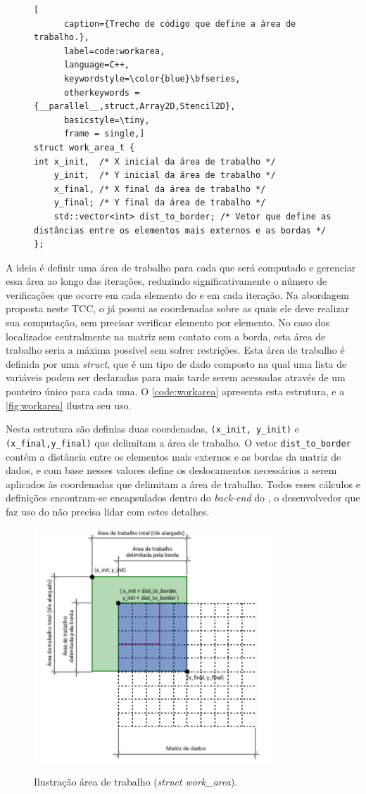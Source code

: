 \begin{figure}[b]
  \begin{lstlisting}[
      caption={Trecho de código que define a área de trabalho.}, 
      label=code:workarea,
      language=C++,
      keywordstyle=\color{blue}\bfseries,
      otherkeywords = {__parallel__,struct,Array2D,Stencil2D}, 
      basicstyle=\tiny, 
      frame = single,]
struct work_area_t {
int x_init,  /* X inicial da área de trabalho */
    y_init,  /* Y inicial da área de trabalho */
    x_final, /* X final da área de trabalho */
    y_final; /* Y final da área de trabalho */
    std::vector<int> dist_to_border; /* Vetor que define as distâncias entre os elementos mais externos e as bordas */
};
  \end{lstlisting}
\end{figure}

A ideia é definir uma área de trabalho para cada \tile que será computado e gerenciar essa área ao longo das iterações, reduzindo significativamente o número de verificações que ocorre em cada elemento do \tile e em cada iteração. Na abordagem proposta neste TCC, o \cluster já possui as coordenadas sobre as quais ele deve realizar sua computação, sem precisar verificar elemento por elemento. No caso dos \tiles localizados centralmente na matriz sem contato com a borda, esta área de trabalho seria a máxima possível sem sofrer restrições.
Esta área de trabalho é definida por uma \textit{struct}, que é um tipo de dado composto na qual uma lista de variáveis podem ser declaradas para mais tarde serem acessadas através de um ponteiro único para cada uma. O \autoref{code:workarea} apresenta esta estrutura, e a \autoref{fig:workarea} ilustra seu uso.

Nesta estrutura são definias duas coordenadas, \texttt{(x\_init, y\_init)} e \texttt{(x\_final,y\_final)} que delimitam a área de trabalho. O vetor \texttt{dist\_to\_border} contém a distância entre os elementos mais externos e as bordas da matriz de dados, e com base nesses valores define os deslocamentos necessários a serem aplicados às coordenadas que delimitam a área de trabalho. Todos esses cálculos e definições encontram-se encapsulados dentro do \textit{back-end} do \pskelmppa \async, o desenvolvedor que faz uso do \fw não precisa lidar com estes detalhes. 

\begin{figure}
  \centering
  \caption{Ilustração área de trabalho (\textit{struct work\_area}).}
  \includegraphics[width=0.8\textwidth]{figs/work_area.pdf}
  \label{fig:workarea}
\end{figure}

